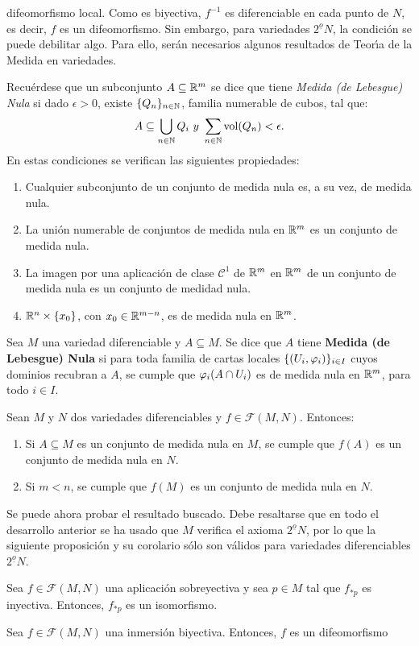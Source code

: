 \documentclass[cursovd_portada.tex]{subfiles}
\begin{document}
difeomorfismo local. Como es biyectiva, $f^{-1}$ es diferenciable
en cada punto de $N$, es decir, $f$ es un difeomorfismo. Sin
embargo, para variedades $2^{\underline{o}}N$, la condici\'{o}n se
puede debilitar algo. Para ello, ser\'{a}n necesarios algunos
resultados de Teor\'{\i}a de la Medida en variedades.
\par
Recu\'{e}rdese que un subconjunto $A\subseteq\mathbb{R}^m$ se dice que
tiene {\it Medida (de Lebesgue) Nula} si dado $\epsilon>0$, existe
$\{Q_n\}_{n\in\mathbb{N}}$, familia numerable de cubos, tal que:
$$A\subseteq\bigcup_{n\in\mathbb{N}}Q_i\mbox{ }y\mbox{ }\sum_{n\in\mathbb{N}}{\rm vol}(Q_n)<\epsilon.$$
\hs En estas condiciones se verifican las siguientes propiedades:
\begin{enumerate}
\item Cualquier subconjunto de un conjunto de medida nula es, a su
vez, de medida nula. \item La uni\'{o}n numerable de conjuntos de
medida nula en $\mathbb{R}^m$ es un conjunto de medida nula. \item La
imagen por una aplicaci\'{o}n de clase $\mathcal{C}^1$ de $\mathbb{R}^m$
en $\mathbb{R}^m$ de un conjunto de medida nula es un conjunto de medidad
nula. \item $\mathbb{R}^n\times\{x_0\}$, con $x_0\in\mathbb{R}^{m-n}$, es de
medida nula en $\mathbb{R}^m$.
\end{enumerate}
\begin{defi}
Sea $M$ una variedad diferenciable y $A\subseteq M$. Se dice que
$A$ tiene {\bf Medida (de Lebesgue) Nula} si para toda familia de
cartas locales $\{(U_i,\varphi_i)\}_{i\in I}$ cuyos dominios recubran
a $A$, se cumple que $\varphi_i(A\cap U_i)$ es de medida nula en
$\mathbb{R}^m$, para todo $i\in I$.
\end{defi}
\begin{prop}
Sean $M$ y $N$ dos variedades diferenciables y
$f\in\mathcal{F}(M,N)$. Entonces:
\begin{enumerate}
\item Si $A\subseteq M$ es un conjunto de medida nula en $M$, se
cumple que $f(A)$ es un conjunto de medida nula en $N$. \item Si
$m<n$, se cumple que $f(M)$ es un conjunto de medida nula en $N$.
\end{enumerate}
\end{prop}
\hs Se puede ahora probar el resultado buscado. Debe resaltarse
que en todo el desarrollo anterior se ha usado que $M$ verifica el
axioma $2^{\underline{o}}N$, por lo que la si\-guien\-te
proposici\'{o}n y su corolario s\'{o}lo son v\'{a}lidos para
variedades diferenciables $2^{\underline{o}}N$.
\begin{prop}
Sea $f\in\mathcal{F}(M,N)$ una aplicaci\'{o}n sobreyectiva y sea
$p\in M$ tal que $f_{*p}$ es inyectiva. Entonces, $f_{*p}$ es un
isomorfismo.
\end{prop}
\begin{coro}
Sea $f\in\mathcal{F}(M,N)$ una inmersi\'{o}n biyectiva. Entonces,
$f$ es un difeomorfismo
\end{coro}
\end{document}
